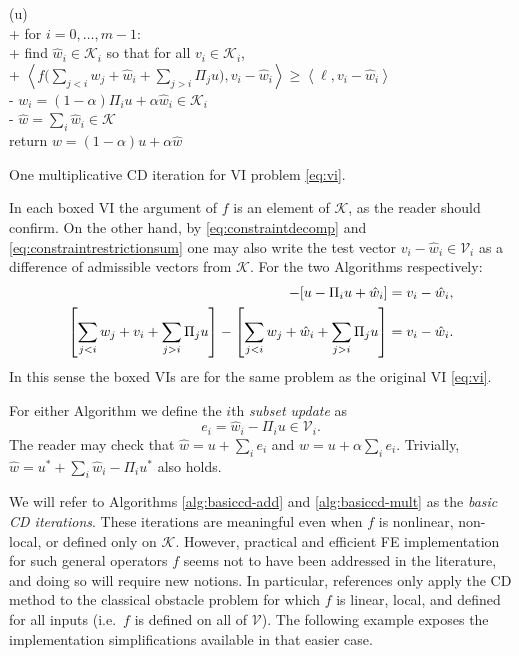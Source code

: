 \documentclass[letterpaper,final,12pt,reqno]{amsart}
\theoremstyle{cstyle}
\theoremstyle{cstyle*}
\theoremstyle{dstyle}
\numberwithin{equation}{section}
\numberwithin{figure}{section}
\numberwithin{table}{section}
\numberwithin{theorem}{section}
\newcommand{\cK}{\mathcal{K}}
\newcommand{\cV}{\mathcal{V}}
\newcommand{\ip}[2]{\left<#1,#2\right>}
\begin{document}
\begin{pseudofloat}
\begin{pseudo*}
(u)\text{:} \\+
    for $i = 0,\dots,m-1$: \\+
        \rm{find} $\hat w_i\in \cK_i$ \rm{so that for all} $v_i\in \cK_i$, \\+
            $\displaystyle \boxed{\ip{f\Big(\sum_{j<i} w_j + \hat w_i + \sum_{j>i} \Pi_j u\Big)}{v_i-\hat w_i} \ge \ip{\ell}{v_i-\hat w_i}}$ \\-
            $w_i = (1-\alpha) \Pi_i u + \alpha \hat w_i\in\cK_i$ \\-
    $\hat w = \sum_i \hat w_i\in\cK$ \\
    return $w=(1-\alpha) u + \alpha \hat w$
\end{pseudo*}
\caption{One multiplicative CD iteration for VI problem \eqref{eq:vi}.}
\label{alg:basiccd-mult}
\end{pseudofloat}

In each boxed VI the argument of $f$ is an element of $\cK$, as the reader should confirm.  On the other hand, by \eqref{eq:constraintdecomp} and \eqref{eq:constraintrestrictionsum} one may also write the test vector $v_i - \hat w_i \in \cV_i$ as a difference of admissible vectors from $\cK$.  For the two Algorithms respectively:
\begin{align*}
[u - \Pi_i u + v_i] - [u - \Pi_i u + \hat w_i] &= v_i - \hat w_i, \label{eq:admissibledifference} \\
\left[\sum_{j<i} w_j + v_i + \sum_{j>i} \Pi_j u\right] - \left[\sum_{j<i} w_j + \hat w_i + \sum_{j>i} \Pi_j u\right] &= v_i - \hat w_i.  \notag
\end{align*}
In this sense the boxed VIs are for the same problem as the original VI \eqref{eq:vi}.

For either Algorithm we define the $i$th \emph{subset update} as
\begin{equation}
e_i = \hat w_i - \Pi_i u \in \cV_i. \label{eq:ithupdate}
\end{equation}
The reader may check that $\hat w = u + \sum_{i} e_i$ and $w = u + \alpha \sum_i e_i$.  Trivially, $\hat w = u^* + \sum_i \hat w_i - \Pi_i u^*$ also holds.

We will refer to Algorithms \ref{alg:basiccd-add} and \ref{alg:basiccd-mult} as the \emph{basic CD iterations}.  These iterations are meaningful even when $f$ is nonlinear, non-local, or defined only on $\cK$.  However, practical and efficient FE implementation for such general operators $f$ seems not to have been addressed in the literature, and doing so will require new notions.  In particular, references \cite{GraeserKornhuber2009,Tai2003} only apply the CD method to the classical obstacle problem for which $f$ is linear, local, and defined for all inputs (i.e.~$f$ is defined on all of $\mathcal{V}$).  The following example exposes the implementation simplifications available in that easier case.
\end{document}

